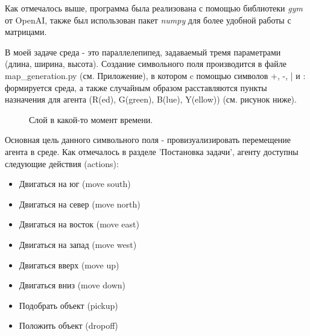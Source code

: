 \documentclass[a4paper]{report}
\theoremstyle{definition}
\theoremstyle{plain}
\theoremstyle{remark}
\theoremstyle{remark}
\theoremstyle{definition}
\begin{document}
Как отмечалось выше, программа была реализована с помощью библиотеки \textit{gym} от OpenAI, также был использован пакет \textit{numpy} для более удобной работы с матрицами.

В моей задаче среда - это параллелепипед, задаваемый тремя параметрами (длина, ширина, высота). Создание символьного поля производится в файле map\_generation.py (см. Приложение), в котором c помощью символов +, -, | и : формируется среда, а также случайным образом расставляются пункты назначения для агента (R(ed), G(green), B(lue), Y(ellow)) (см. рисунок ниже).
\begin{figure}[H]
	\caption{Слой в какой-то момент времени.}
\end{figure}

Основная цель данного символьного поля - провизуализировать перемещение агента в среде. Как отмечалось в разделе 'Постановка задачи', агенту доступны следующие действия (actions):
\begin{itemize}
\item Двигаться на юг (move south)
\item Двигаться на север (move north)
\item Двигаться на восток (move east)
\item Двигаться на запад (move west)
\item Двигаться вверх (move up)
\item Двигаться вниз (move down)
\item Подобрать объект (pickup)
\item Положить объект (dropoff)
 \end{itemize}
\end{document}
